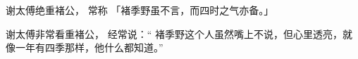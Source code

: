 
\switchcolumn*[\section{}]

谢太傅绝重褚公，
常称
「褚季野虽不言，而四时之气亦备。」

\switchcolumn


谢太傅非常看重褚公，
经常说：“
褚季野这个人虽然嘴上不说，但心里透亮，就像一年有四季那样，他什么都知道。”
